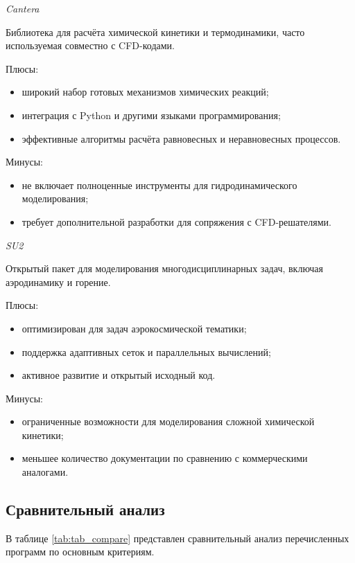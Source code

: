 \textit{Cantera}

Библиотека для расчёта химической кинетики и термодинамики, часто используемая совместно с CFD-кодами.

Плюсы:
\begin{itemize}
    \item широкий набор готовых механизмов химических реакций;
    \item интеграция с Python и другими языками программирования;
    \item эффективные алгоритмы расчёта равновесных и неравновесных процессов.
\end{itemize}

Минусы:
\begin{itemize}
    \item не включает полноценные инструменты для гидродинамического моделирования;
    \item требует дополнительной разработки для сопряжения с CFD-решателями.
\end{itemize}

\textit{SU2}

Открытый пакет для моделирования многодисциплинарных задач, включая аэродинамику и горение.

Плюсы:
\begin{itemize}
    \item оптимизирован для задач аэрокосмической тематики;
    \item поддержка адаптивных сеток и параллельных вычислений;
    \item активное развитие и открытый исходный код.
\end{itemize}

Минусы:
\begin{itemize}
    \item ограниченные возможности для моделирования сложной химической кинетики;
    \item меньшее количество документации по сравнению с коммерческими аналогами.
\end{itemize}

\subsection{Сравнительный анализ}

В таблице \ref{tab:tab_compare} представлен сравнительный анализ перечисленных программ по основным критериям.


